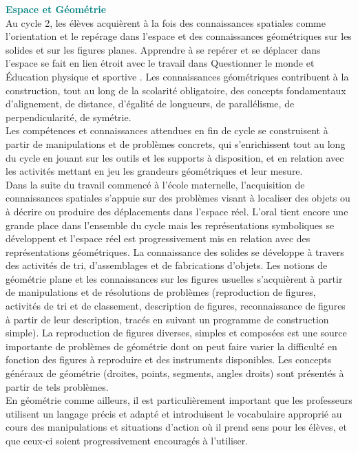 \begin{center}
   \begin{minipage}{16cm}
      \textsf{\textcolor{teal}{\bf\large Espace et Géométrie} \\
         Au cycle 2, les élèves acquièrent à la fois des connaissances spatiales comme l’orientation et le repérage dans l’espace et des connaissances géométriques sur les solides et sur les figures planes. Apprendre à se repérer et se déplacer dans l’espace se fait en lien étroit avec le travail dans \og Questionner le monde \fg{} et \og Éducation physique et sportive \fg. Les connaissances géométriques contribuent à la construction, tout au long de la scolarité obligatoire, des concepts fondamentaux d’alignement, de distance, d’égalité de longueurs, de parallélisme, de perpendicularité, de symétrie. \\
         Les compétences et connaissances attendues en fin de cycle se construisent à partir de manipulations et de problèmes concrets, qui s’enrichissent tout au long du cycle en jouant sur les outils et les supports à disposition, et en relation avec les activités mettant en jeu les grandeurs géométriques et leur mesure. \\
         Dans la suite du travail commencé à l’école maternelle, l’acquisition de connaissances spatiales s’appuie sur des problèmes visant à localiser des objets ou à décrire ou produire des déplacements dans l’espace réel. L’oral tient encore une grande place dans l’ensemble du cycle mais les représentations symboliques se développent et l’espace réel est progressivement mis en relation avec des représentations géométriques. La connaissance des solides se développe à travers des activités de tri, d’assemblages et de fabrications d’objets. Les notions de géométrie plane et les connaissances sur les figures usuelles s’acquièrent à partir de manipulations et de résolutions de problèmes (reproduction de figures, activités de tri et de classement, description de figures, reconnaissance de figures à partir de leur description, tracés en suivant un programme de construction simple). La reproduction de figures diverses, simples et composées est une source importante de problèmes de géométrie dont on peut faire varier la difficulté en fonction des figures à reproduire et des instruments disponibles. Les concepts généraux de géométrie (droites, points, segments, angles droits) sont présentés à partir de tels problèmes. \\
         En géométrie comme ailleurs, il est particulièrement important que les professeurs utilisent un langage précis et adapté et introduisent le vocabulaire approprié au cours des manipulations et situations d’action où il prend sens pour les élèves, et que ceux-ci soient progressivement encouragés à l’utiliser.}
   \end{minipage}
\end{center}


